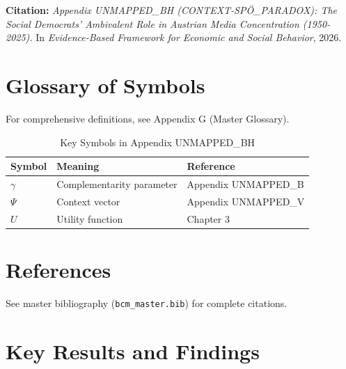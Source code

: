{\begin{tcolorbox}[colback=orange!5!white, colframe=orange!75!black,
    title=Cross-Reference Links]
\textbf{Citation:}
\textit{Appendix UNMAPPED_BH (CONTEXT-SPÖ_PARADOX): The Social Democrats' Ambivalent Role in Austrian Media Concentration (1950-2025).}
In \textit{Evidence-Based Framework for Economic and Social Behavior}, 2026.

\end{tcolorbox}



\section{Glossary of Symbols}
\label{sec:bh-glossary}

For comprehensive definitions, see Appendix G (Master Glossary).

\begin{table}[htbp]
\centering
\caption{Key Symbols in Appendix UNMAPPED_BH}
\begin{tabular}{lll}
\toprule
\textbf{Symbol} & \textbf{Meaning} & \textbf{Reference} \\
\midrule
$\gamma$ & Complementarity parameter & Appendix UNMAPPED_B \\
$\Psi$ & Context vector & Appendix UNMAPPED_V \\
$U$ & Utility function & Chapter 3 \\
\bottomrule
\end{tabular}
\end{table}


\section{References}
\label{sec:references}

See master bibliography (\texttt{bcm\_master.bib}) for complete citations.

\nocite{bcm_master}



\section{Key Results and Findings}
\label{sec:results}

}
